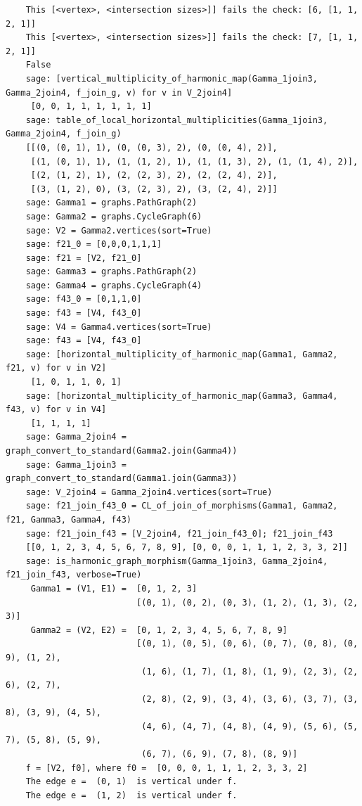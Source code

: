 \documentclass{article}
\begin{document}
{{\begin{verbatim}
    This [<vertex>, <intersection sizes>]] fails the check: [6, [1, 1, 2, 1]]
    This [<vertex>, <intersection sizes>]] fails the check: [7, [1, 1, 2, 1]]
    False
    sage: [vertical_multiplicity_of_harmonic_map(Gamma_1join3, Gamma_2join4, f_join_g, v) for v in V_2join4]   
     [0, 0, 1, 1, 1, 1, 1, 1]
    sage: table_of_local_horizontal_multiplicities(Gamma_1join3, Gamma_2join4, f_join_g)                                                       
    [[(0, (0, 1), 1), (0, (0, 3), 2), (0, (0, 4), 2)],
     [(1, (0, 1), 1), (1, (1, 2), 1), (1, (1, 3), 2), (1, (1, 4), 2)],
     [(2, (1, 2), 1), (2, (2, 3), 2), (2, (2, 4), 2)],
     [(3, (1, 2), 0), (3, (2, 3), 2), (3, (2, 4), 2)]]
    sage: Gamma1 = graphs.PathGraph(2)  
    sage: Gamma2 = graphs.CycleGraph(6)   
    sage: V2 = Gamma2.vertices(sort=True) 
    sage: f21_0 = [0,0,0,1,1,1]         
    sage: f21 = [V2, f21_0]              
    sage: Gamma3 = graphs.PathGraph(2)    
    sage: Gamma4 = graphs.CycleGraph(4)   
    sage: f43_0 = [0,1,1,0]     
    sage: f43 = [V4, f43_0]     
    sage: V4 = Gamma4.vertices(sort=True)   
    sage: f43 = [V4, f43_0]   
    sage: [horizontal_multiplicity_of_harmonic_map(Gamma1, Gamma2, f21, v) for v in V2]  
     [1, 0, 1, 1, 0, 1]
    sage: [horizontal_multiplicity_of_harmonic_map(Gamma3, Gamma4, f43, v) for v in V4]            
     [1, 1, 1, 1]
    sage: Gamma_2join4 = graph_convert_to_standard(Gamma2.join(Gamma4))  
    sage: Gamma_1join3 = graph_convert_to_standard(Gamma1.join(Gamma3))   
    sage: V_2join4 = Gamma_2join4.vertices(sort=True)    
    sage: f21_join_f43_0 = CL_of_join_of_morphisms(Gamma1, Gamma2, f21, Gamma3, Gamma4, f43)  
    sage: f21_join_f43 = [V_2join4, f21_join_f43_0]; f21_join_f43       
    [[0, 1, 2, 3, 4, 5, 6, 7, 8, 9], [0, 0, 0, 1, 1, 1, 2, 3, 3, 2]]
    sage: is_harmonic_graph_morphism(Gamma_1join3, Gamma_2join4, f21_join_f43, verbose=True)  
     Gamma1 = (V1, E1) =  [0, 1, 2, 3]
                          [(0, 1), (0, 2), (0, 3), (1, 2), (1, 3), (2, 3)]
     Gamma2 = (V2, E2) =  [0, 1, 2, 3, 4, 5, 6, 7, 8, 9]
                          [(0, 1), (0, 5), (0, 6), (0, 7), (0, 8), (0, 9), (1, 2),
                           (1, 6), (1, 7), (1, 8), (1, 9), (2, 3), (2, 6), (2, 7),
                           (2, 8), (2, 9), (3, 4), (3, 6), (3, 7), (3, 8), (3, 9), (4, 5),
                           (4, 6), (4, 7), (4, 8), (4, 9), (5, 6), (5, 7), (5, 8), (5, 9),
                           (6, 7), (6, 9), (7, 8), (8, 9)]
    f = [V2, f0], where f0 =  [0, 0, 0, 1, 1, 1, 2, 3, 3, 2]
    The edge e =  (0, 1)  is vertical under f.
    The edge e =  (1, 2)  is vertical under f.

\end{verbatim}}}
\end{document}
